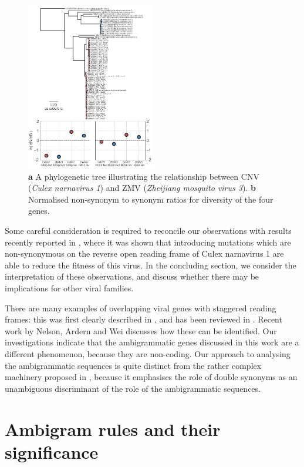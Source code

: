 \documentclass[unnumsec,webpdf,contemporary,large,namedate]{oup-authoring-template}%
\theoremstyle{thmstyleone}%
\theoremstyle{thmstyletwo}%
\theoremstyle{thmstylethree}%
\begin{document}
\begin{figure}
\begin{center}
\includegraphics[width=0.5\textwidth]{narna-zhcx.png}
\caption{\label{fig: 1}
{\bf a} A phylogenetic tree illustrating the relationship between CNV (\emph{Culex narnavirus 1}) and 
ZMV (\emph{Zheijiang mosquito virus 3}). {\bf b} Normalised non-synonym to synonym ratios 
for diversity of the four genes.
}
\end{center}
\end{figure}

Some careful consideration is required to reconcile our observations with results recently reported 
in \cite{Ret+20}, where it was shown that introducing mutations which are non-synonymous on the reverse 
open reading frame of Culex narnavirus 1 are able to reduce the fitness of this virus.
In the concluding section, we consider the interpretation of these observations, and discuss whether there 
may be implications for other viral families. 

There are many examples of overlapping viral genes with staggered reading frames: this was first
clearly described in \cite{Bar+76}, and has been reviewed in \cite{Chi+10}. Recent 
work by Nelson, Ardern and Wei \citep{Nel+20} discusses how these can be identified. 
Our investigations indicate that the ambigrammatic genes discussed in this work are a 
different phenomenon, because they are non-coding. Our approach to analysing the ambigrammatic 
sequences is quite distinct from the rather complex machinery proposed in \cite{Nel+20}, because 
it emphasises the role of double synonyms as an unambiguous discriminant of the role of the ambigrammatic 
sequences.

\section{Ambigram rules and their significance}
\label{sec: 2}
\end{document}
